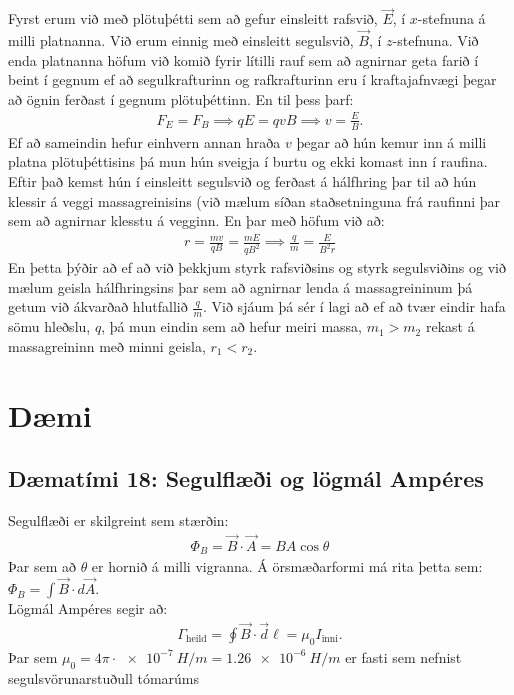 Fyrst erum við með plötuþétti sem að gefur einsleitt rafsvið, $\vec{E}$, í $x$-stefnuna á milli platnanna. Við erum einnig með einsleitt segulsvið, $\vec{B}$, í $z$-stefnuna. Við enda platnanna höfum við komið fyrir lítilli rauf sem að agnirnar geta farið í beint í gegnum ef að segulkrafturinn og rafkrafturinn eru í kraftajafnvægi þegar að ögnin ferðast í gegnum plötuþéttinn. En til þess þarf:
\begin{align*}
    F_E = F_B \implies qE = qvB \implies v = \frac{E}{B}.
\end{align*}
Ef að sameindin hefur einhvern annan hraða $v$ þegar að hún kemur inn á milli platna plötuþéttisins þá mun hún sveigja í burtu og ekki komast inn í raufina. Eftir það kemst hún í einsleitt segulsvið og ferðast á hálfhring þar til að hún klessir á veggi massagreinisins (við mælum síðan staðsetninguna frá raufinni þar sem að agnirnar klesstu á vegginn. En þar með höfum við að:
\begin{align*}
    r = \frac{mv}{qB} = \frac{mE}{qB^2} \implies \frac{q}{m} = \frac{E}{B^2 r}
\end{align*}
En þetta þýðir að ef að við þekkjum styrk rafsviðsins og styrk segulsviðins og við mælum geisla hálfhringsins þar sem að agnirnar lenda á massagreininum þá getum við ákvarðað hlutfallið $\frac{q}{m}$. Við sjáum þá sér í lagi að ef að tvær eindir hafa sömu hleðslu, $q$, þá mun eindin sem að hefur meiri massa, $m_1 > m_2$ rekast á massagreininn með minni geisla, $r_1 < r_2$.

\newpage

\section{Dæmi}

\subsection*{Dæmatími 18: Segulflæði og lögmál Ampéres}

\begin{tcolorbox}
Segulflæði er skilgreint sem stærðin:
\begin{align*}
    \Phi_B = \vec{B} \cdot \vec{A} = BA\cos\theta
\end{align*}
Þar sem að $\theta$ er hornið á milli vigranna. Á örsmæðarformi má rita þetta sem: $\displaystyle \Phi_B = \int \vec{B} \cdot d\vec{A}$. \\
Lögmál Ampéres segir að:
\begin{align*}
    \Gamma_{\text{heild}} = \oint \vec{B} \cdot \vec{d}\ell = \mu_0 I_{\text{inni}}.
\end{align*}
Þar sem $\mu_0 = 4\pi \cdot \SI{e-7}{H/m} = \SI{1.26e-6}{H/m}$ er fasti sem nefnist segulsvörunarstuðull tómarúms
\end{tcolorbox}


